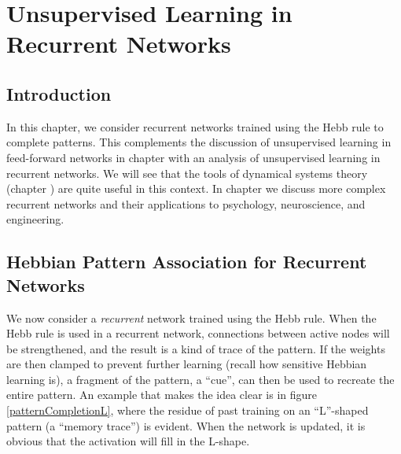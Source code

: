 \chapter{Unsupervised Learning in Recurrent Networks}\label{ch_unsupervised_recurrent}


\section{Introduction}

In this chapter, we consider recurrent networks trained using the Hebb rule to complete patterns. This complements the discussion of unsupervised learning in feed-forward networks in chapter  with an analysis of unsupervised learning in recurrent networks. We will see that the tools of dynamical systems theory (chapter ) are quite useful in this context. In chapter  we discuss more complex recurrent networks and their applications to psychology, neuroscience, and engineering.
  
\section{Hebbian Pattern Association for Recurrent Networks}

We now consider a \emph{recurrent} network trained using the Hebb rule. When the Hebb rule is used in a recurrent network, connections between active nodes will be strengthened, and the result is a kind of trace of the pattern. If the weights are then clamped to prevent further learning (recall how sensitive Hebbian learning is), a fragment of the pattern, a ``cue'', can then be used to recreate the entire pattern. An example that makes the idea clear is in figure \ref{patternCompletionL}, where the residue of past training on an ``L''-shaped pattern (a ``memory trace'') is evident. When the network is updated, it is obvious that the activation will fill in the L-shape. 

